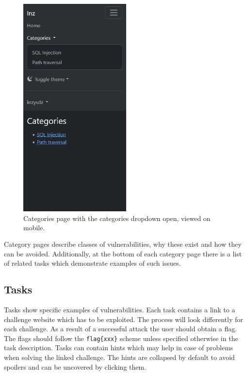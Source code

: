 \begin{figure}
    \centering
    \includegraphics[width=0.5\textwidth]{img/manual-categories.png}
    \caption{Categories page with the categories dropdown open, viewed on mobile.}
    \label{fig:manual-categories}
\end{figure}

Category pages describe classes of vulnerabilities, why these exist and how they can be avoided. Additionally, at the bottom of each category page there is a list of related tasks which demonstrate examples of such issues.

\subsection{Tasks}

Tasks show specific examples of vulnerabilities. Each task contains a link to a challenge website which has to be exploited. The process will look differently for each challenge. As a result of a successful attack the user should obtain a flag. The flags should follow the \texttt{flag\{xxx\}} scheme unless specified otherwise in the task description. Tasks can contain hints which may help in case of problems when solving the linked challenge. The hints are collapsed by default to avoid spoilers and can be uncovered by clicking them.

